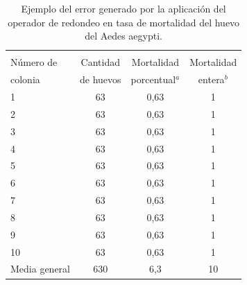 \begin{table}
    \begin{minipage}{\textwidth}
        \centering
        \caption{ \label{tab:mortalidad-huevo-error} Ejemplo del error generado por la aplicación
        del operador de redondeo en tasa de mortalidad del huevo del Aedes aegypti.}
        \begin{tabular}{l c c c }
                    \hline \\
                    Número de & Cantidad  & Mortalidad      & Mortalidad \\
                    colonia   & de huevos & porcentual$^{a}$ & entera$^{b}$\\
                    \hline
                    \hline
                    1       & 63  & 0,63 & 1\\
                    2       & 63  & 0,63 & 1\\
                    3       & 63  & 0,63 & 1\\
                    4       & 63  & 0,63 & 1\\
                    5       & 63  & 0,63 & 1\\
                    6       & 63  & 0,63 & 1\\
                    7       & 63  & 0,63 & 1\\
                    8       & 63  & 0,63 & 1\\
                    9       & 63  & 0,63 & 1\\
                    10      & 63  & 0,63 & 1\\
                    Media general  & 630 & 6,3 & 10\\

        \end{tabular}
    \end{minipage}
\end{table}
